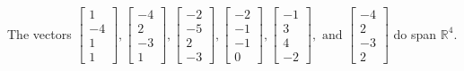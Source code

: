\begin{exercise}
\begin{exerciseStatement}
  \end{exerciseStatement}
  \begin{exerciseAnswer}
   The vectors \(\left[\begin{array}{r}
1 \\
-4 \\
1 \\
1
\end{array}\right] , \left[\begin{array}{r}
-4 \\
2 \\
-3 \\
1
\end{array}\right] , \left[\begin{array}{r}
-2 \\
-5 \\
2 \\
-3
\end{array}\right] , \left[\begin{array}{r}
-2 \\
-1 \\
-1 \\
0
\end{array}\right] , \left[\begin{array}{r}
-1 \\
3 \\
4 \\
-2
\end{array}\right] , \text{ and } \left[\begin{array}{r}
-4 \\
2 \\
-3 \\
2
\end{array}\right]\) 
  	 do  
	span \(\mathbb{R}^4\).
  


  \end{exerciseAnswer}
\end{exercise}
